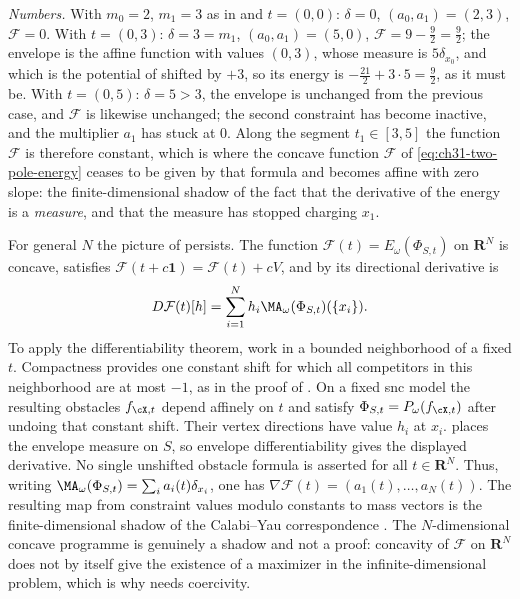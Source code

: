 \begin{example}
\emph{Numbers.}  With $m_0=2$, $m_1=3$ as in
 and $t=(0,0)$: $\delta=0$,
$(a_0,a_1)=(2,3)$, $\mathcal F=0$.  With $t=(0,3)$: $\delta=3=m_1$,
$(a_0,a_1)=(5,0)$, $\mathcal F=9-\tfrac92=\tfrac92$; the envelope is the
affine function with values $(0,3)$, whose measure is $5\delta_{x_0}$,
and which is the potential of  shifted by
$+3$, so its energy is $-\tfrac{21}2+3\cdot5=\tfrac92$, as it must be.
With $t=(0,5)$: $\delta=5>3$, the envelope is unchanged from the
previous case, and $\mathcal F$ is likewise unchanged; the second constraint has
become inactive, and the multiplier $a_1$ has stuck at $0$.  Along the
segment $t_1\in[3,5]$ the function $\mathcal F$ is therefore constant, which is
where the concave function $\mathcal F$ of \eqref{eq:ch31-two-pole-energy} ceases
to be given by that formula and becomes affine with zero slope: the
finite-dimensional shadow of the fact that the derivative of the energy is a
\emph{measure}, and that the measure has stopped charging $x_1$.
\end{example}

\begin{remark}
\label{rem:ch31-programme-general}
For general $N$ the picture of  persists.
The function
$\mathcal F(t)=E_\omega(\Phi_{S,t})$ on $\mathbf R^N$ is concave, satisfies
$\mathcal F(t+c\mathbf 1)=\mathcal F(t)+cV$, and by
 its directional derivative is
\[
             D\mathcal F(t)[h]
                =\sum_{i=1}^N h_i
                   \MA_\omega(\Phi_{S,t})(\{x_i\}).
\]
To apply the differentiability theorem, work in a bounded neighborhood
of a fixed $t$.  Compactness provides one constant shift for which all
competitors in this neighborhood are at most $-1$, as in the proof of
.  On a fixed snc model the resulting
obstacles $f_{\cX,t}$ depend affinely on $t$ and satisfy
$\Phi_{S,t}=P_\omega(f_{\cX,t})$ after undoing that constant shift.
Their vertex directions have value $h_i$ at $x_i$.
 places the envelope measure on $S$,
so envelope differentiability gives the displayed derivative.  No single
unshifted obstacle formula is asserted for all $t\in\mathbf R^N$.  Thus, writing
$\MA_\omega(\Phi_{S,t})=\sum_i a_i(t)\delta_{x_i}$, one has
$\nabla\mathcal F(t)=(a_1(t),\ldots,a_N(t))$.  The resulting map from
constraint values modulo constants to mass vectors is the
finite-dimensional shadow of the Calabi--Yau correspondence
.  The
$N$-dimensional concave programme is genuinely a shadow and not a proof:
concavity of $\mathcal F$ on $\mathbf R^N$ does not by itself give the
existence of a maximizer in the infinite-dimensional problem, which is why
 needs coercivity.
\end{remark}


